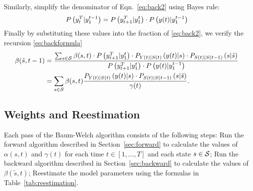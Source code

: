 Similarly, simplify the denominator of Eqn.~\eqref{eq:back2} using
Bayes rule:
\begin{equation*}
  P \left(y_{t}^{T}|y_{1}^{t-1} \right) = P
  \left(y_{t+1}^{T}|y_{1}^{t}  \right) \cdot {P \left(
  {y}{(t)}|y_{1}^{t-1}\right)}
\end{equation*}
Finally by substituting these values into the fraction of
\eqref{eq:back2}, we verify the recursion \eqref{eq:backformula}
\begin{align}
  \mlabel{eq:back3} \beta({\tilde s},t-1) &= \frac{\sum_{s\in\states}
    \beta(s,t) \cdot P \left(\ts{y}{t+1}{T}|\ts{y}{1}{t} \right)
    \cdot P_{\ti{Y}{t}|\ti{S}{t}} \left(\ti{y}{t}|s \right) \cdot
    P_{\ti{S}{t}|\ti{S}{t-1}} \left(s|{\tilde s} \right)} {P
    \left(\ts{y}{t+1}{T}|\ts{y}{1}{t} \right) \cdot {P \left(
        \ti{y}{t}|\ts{y}{1}{t-1}\right)}} \\
  \mlabel{eq:back4} &= \sum_{s\in\states} \beta(s,t) \frac{
    P_{\ti{Y}{t}|\ti{S}{t}} \left(\ti{y}{t}|s \right) \cdot
    P_{\ti{S}{t}|\ti{S}{t-1}} \left(s|{\tilde s} \right)} {\ti{\gamma}{t}}.
\end{align}

\subsection{Weights and Reestimation}
\label{sec:reestimation}

Each pass of the Baum-Welch algorithm consists of the following steps:
Run the forward algorithm described in Section~\ref{sec:forward} to
calculate the values of $\alpha(s,t)$ and $\gamma(t)$ for each time $t
\in [1,\ldots,T]$ and each state $s \in \states$; Run the backward
algorithm described in Section~\ref{sec:backward} to calculate the
values of $\beta({\tilde s},t)$; Reestimate the model parameters using the
formulas in Table~\ref{tab:reestimation}.

